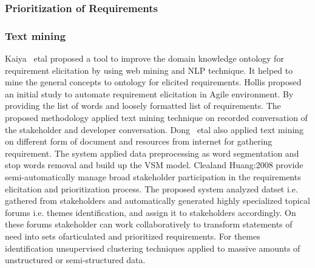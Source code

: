 \subsubsection{Prioritization of Requirements} 

\subsubsection{Text mining} 
 Kaiya ~etal \cite {Kaiya:2010} proposed a
tool to improve the domain knowledge ontology for requirement elicitation by using web mining and NLP
technique. It helped to mine the general
concepts to ontology for elicited requirements.
Hollis \etal\cite{Hollis2017} proposed an initial study to
automate requirement elicitation in Agile environment. By providing the list of
words and loosely formatted list of requirements. The proposed methodology
applied text mining technique on recorded conversation of the stakeholder and
developer conversation. Dong ~etal \cite{dong2010} also applied text mining on
different form of document and resources from internet for gathering
requirement. The system applied data preprocessing as word segmentation and stop
words removal and build up the VSM model.  {Clealand Huang:2008} provide semi-automatically manage broad stakeholder participation in the requirements elicitation and prioritization process. 
The proposed system analyzed datset i.e. gathered from stakeholders and automatically generated highly specialized topical forums i.e. themes identification, and assign it to stakeholders accordingly.
On these forums stakeholder can work collaboratively to transform statements of need into sets ofarticulated and prioritized requirements. For themes identification unsupervised clustering
techniques applied to massive amounts of unstructured or semi-structured data. 


